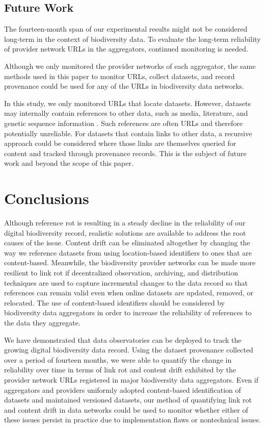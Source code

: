 \subsection*{Future Work}
The fourteen-month span of our experimental results might not be considered long-term in the context of biodiversity data. To evaluate the long-term reliability of provider network URLs in the aggregators, continued monitoring is needed.

Although we only monitored the provider networks of each aggregator, the same methods used in this paper to monitor URLs, collect datasets, and record provenance could be used for any of the URLs in biodiversity data networks.

In this study, we only monitored URLs that locate datasets. However, datasets may internally contain references to other data, such as media, literature, and genetic sequence information \citep{Wieczorek_2012}. Such references are often URLs and therefore potentially unreliable. For datasets that contain links to other data, a recursive approach could be considered where those links are themselves queried for content and tracked through provenance records. This is the subject of future work and beyond the scope of this paper.


\section*{Conclusions}
Although reference rot is resulting in a steady decline in the reliability of our digital biodiversity record, realistic solutions are available to address the root causes of the issue. Content drift can be eliminated altogether by changing the way we reference datasets from using location-based identifiers to ones that are content-based. Meanwhile, the biodiversity provider networks can be made more resilient to link rot if decentralized observation, archiving, and distribution techniques are used to capture incremental changes to the data record so that references can remain valid even when online datasets are updated, removed, or relocated. The use of content-based identifiers should be considered by biodiversity data aggregators in order to increase the reliability of references to the data they aggregate.

We have demonstrated that data observatories can be deployed to track the growing digital biodiversity data record. Using the dataset provenance collected over a period of fourteen months, we were able to quantify the change in reliability over time in terms of link rot and content drift exhibited by the provider network URLs registered in major biodiversity data aggregators. Even if aggregators and providers uniformly adopted content-based identification of datasets and maintained versioned datasets, our method of quantifying link rot and content drift in data networks could be used to monitor whether either of these issues persist in practice due to implementation flaws or nontechnical issues.

